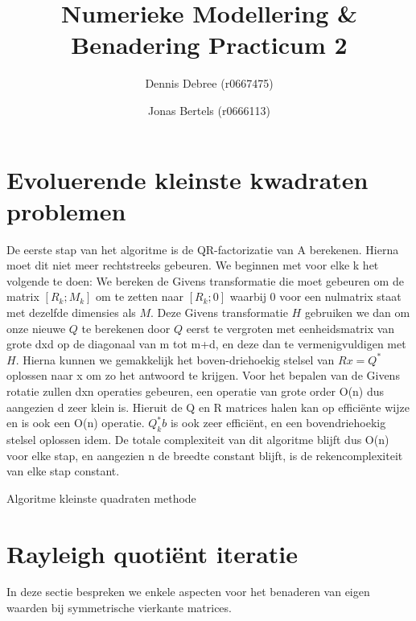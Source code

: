 \documentclass[a4paper]{article}
\title{Numerieke Modellering \& Benadering Practicum 2}
\author{Dennis Debree (r0667475) \and Jonas Bertels (r0666113)}
\begin{document}
\maketitle

\section{Evoluerende kleinste kwadraten problemen}
De eerste stap van het algoritme is de QR-factorizatie van A berekenen. Hierna moet dit niet meer rechtstreeks gebeuren. We beginnen met voor elke k het volgende te doen: We bereken de Givens transformatie die moet gebeuren om de matrix $[R_{k}; M_{k}]$ om te zetten naar $[R_{k}; 0]$ waarbij 0 voor een nulmatrix staat met dezelfde dimensies als $M$. Deze Givens transformatie $H$ gebruiken we dan om onze nieuwe $Q$ te berekenen door $Q$ eerst te vergroten met eenheidsmatrix van grote dxd op de diagonaal van m tot m+d, en deze dan te vermenigvuldigen met $H$. Hierna kunnen we gemakkelijk het boven-driehoekig stelsel van $Rx = Q^{*}$ oplossen naar x om zo het antwoord te krijgen. Voor het bepalen van de Givens rotatie zullen dxn operaties gebeuren, een operatie van grote order O(n) dus aangezien d zeer klein is. Hieruit de Q en R matrices halen kan op efficiënte wijze en is ook een O(n) operatie. $Q_{k}^{*}b$ is ook zeer efficiënt, en een bovendriehoekig stelsel oplossen idem. De totale complexiteit van dit algoritme blijft dus O(n) voor elke stap, en aangezien n de breedte constant blijft, is de rekencomplexiteit van elke stap constant.
\begin{algorithm}[H]
	\caption{Algoritme kleinste quadraten methode }
\end{algorithm}
\section{Rayleigh quotiënt iteratie}
	In deze sectie bespreken we enkele aspecten voor het benaderen van eigen waarden bij symmetrische vierkante matrices.
\end{document}
